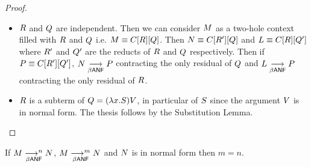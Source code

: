 {\begin{proof}
	\begin{itemize}
		\item $R$ and $Q$ are independent. Then we can consider $M$ as a two-hole context filled with $R$ and $Q$ i.e. $M\equiv C[R][Q]$. Then $N\equiv C[R'][Q]$ and $L\equiv C[R][Q']$ where $R'$ and $Q'$ are the reducts of $R$ and $Q$ respectively. Then if $P\equiv C[R'][Q']$, $N\underset{\beta\mathsf{ANF}}{\longrightarrow}P$ contracting the only residual of $Q$ and $L\underset{\beta\mathsf{ANF}}{\longrightarrow}P$ contracting the only residual of $R$.
		\item $R$ is a subterm of $Q=(\lambda x.S)V$, in particular of $S$ since the argument $V$ is in normal form. The thesis follows by the Substitution Lemma.
	\end{itemize}
\end{proof}
\begin{corollary}\label{corollary:equiv}
	If $M\underset{\beta\mathsf{ANF}}{\longrightarrow^{n}}N$, $M\underset{\beta\mathsf{ANF}}{\longrightarrow^{m}}N$ and $N$ is in normal form then $m=n$.
\end{corollary}}{}
